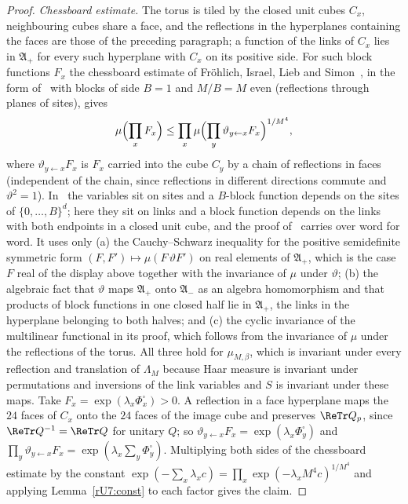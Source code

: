 \begin{proof}
\emph{Chessboard estimate.} The torus is tiled by the closed unit cubes
$C_x$, neighbouring cubes share a face, and the reflections in the
hyperplanes containing the faces are those of the preceding paragraph; a
function of the links of $C_x$ lies in $\mathfrak A_+$ for every such
hyperplane with $C_x$ on its positive side. For such block functions $F_x$
the chessboard estimate of Fr\"ohlich, Israel, Lieb and
Simon~\cite{FILS78}, in the form of~\cite[Theorem~5.8]{Bis09} with blocks of
side $B=1$ and $M/B=M$ even (reflections through planes of sites), gives
\[
\mu\Bigl(\prod_xF_x\Bigr)\le\prod_x\mu\Bigl(\prod_y\vartheta_{y\leftarrow x}
F_x\Bigr)^{1/M^4},
\]
where $\vartheta_{y\leftarrow x}F_x$ is $F_x$ carried into the cube $C_y$ by
a chain of reflections in faces (independent of the chain, since
reflections in different directions commute and $\vartheta^2=1$).
In~\cite{Bis09} the variables sit on sites and a $B$-block function depends
on the sites of $\{0,\dots,B\}^d$; here they sit on links and a block
function depends on the links with both endpoints in a closed unit cube, and
the proof of~\cite[Theorem~5.8]{Bis09} carries over word for word. It uses
only (a) the Cauchy--Schwarz inequality for the positive semidefinite
symmetric form $(F,F')\mapsto\mu(F\,\vartheta F')$ on real elements of
$\mathfrak A_+$, which is the case $F$ real of the display above together
with the invariance of $\mu$ under $\vartheta$; (b) the algebraic fact that
$\vartheta$ maps $\mathfrak A_+$ onto $\mathfrak A_-$ as an algebra
homomorphism and that products of block functions in one closed half lie in
$\mathfrak A_+$, the links in the hyperplane belonging to both halves; and
(c) the cyclic invariance of the multilinear functional in its proof, which
follows from the invariance of $\mu$ under the reflections of the torus.
All three hold for $\mu_{M,\beta}$, which is invariant under every
reflection and translation of $\Lambda_M$ because Haar measure is invariant
under permutations and inversions of the link variables and $S$ is invariant
under these maps. Take $F_x=\exp(\lambda_x\Phi^\square_x)>0$. A reflection in a face
hyperplane maps the $24$ faces of $C_x$ onto the $24$ faces of the image
cube and preserves $\ReTr Q_p$, since $\ReTr Q^{-1}=\ReTr Q$ for unitary $Q$;
so $\vartheta_{y\leftarrow x}F_x=\exp(\lambda_x\Phi^\square_y)$ and
$\prod_y\vartheta_{y\leftarrow x}F_x=\exp(\lambda_x\sum_y\Phi^\square_y)$.
Multiplying both sides of the chessboard estimate by the constant
$\exp(-\sum_x\lambda_xc)=\prod_x\exp(-\lambda_xM^4c)^{1/M^4}$ and applying
Lemma~\ref{rU7:const} to each factor gives the claim.
\end{proof}

